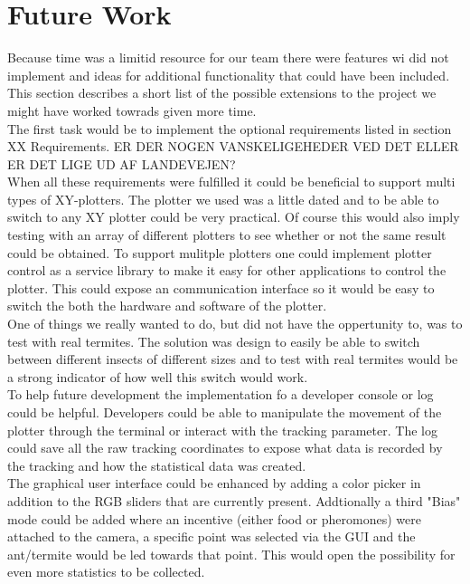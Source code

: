 
\section{Future Work}

Because time was a limitid resource for our team there were features wi did not implement and ideas for additional functionality that could have been included. This section describes a short list of the possible extensions to the project we might have worked towrads given more time. \\

The first task would be to implement the optional requirements listed in section XX Requirements. ER DER NOGEN VANSKELIGEHEDER VED DET ELLER ER DET LIGE UD AF LANDEVEJEN? \\

When all these requirements were fulfilled it could be beneficial to support multi types of XY-plotters. The plotter we used was a little dated and to be able to switch to any XY plotter could be very practical. Of course this would also imply testing with an array of different plotters to see whether or not the same result could be obtained. To support mulitple plotters one could implement plotter control as a service library to make it easy for other applications to control the plotter. This could expose an communication interface so it would be easy to switch the both the hardware and software of the plotter. \\

One of things we really wanted to do, but did not have the oppertunity to, was to test with real termites. The solution was design to easily be able to switch between different insects of different sizes and to test with real termites would be a strong indicator of how well this switch would work. \\

To help future development the implementation fo a developer console or log could be helpful. Developers could be able to manipulate the movement of the plotter through the terminal or interact with the tracking parameter. The log could save all the raw tracking coordinates to expose what data is recorded by the tracking and how the statistical data was created. \\

The graphical user interface could be enhanced by adding a color picker in addition to the RGB sliders that are currently present. Addtionally a third "Bias" mode could be added where an incentive (either food or pheromones) were attached to the camera, a specific point was selected via the GUI and the ant/termite would be led towards that point. This would open the possibility for even more statistics to be collected.